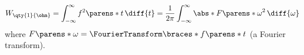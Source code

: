 \begin{multicols}{2}
\begin{CheatsheetEntryFrame}



    \end{CheatsheetEntryFrame}

    \begin{CheatsheetEntryFrame}

        \begin{equation*}
            W_{\qty{1}{\ohm}}
            = \int_{-\infty}^\infty f^2\parens*{t} \,\diff{t}
            = \frac{1}{2 \pi} \int_{-\infty}^\infty{
                \abs*{F\parens*{\omega}}^2 \,\diff{\omega}
            }
        \end{equation*}
        where $F\parens*{\omega} = \FourierTransform\braces*{f\parens*{t}}$ (a Fourier transform).


\end{CheatsheetEntryFrame}
\end{multicols}
